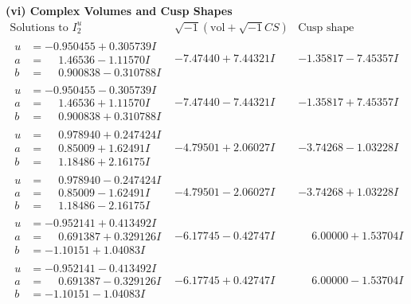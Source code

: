 \documentclass[1p]{elsarticle_modified}
\theoremstyle{definition}
\newcommand{\I}{\sqrt{-1}}
\begin{document}
\newpage\flushleft \textbf{(vi) Complex Volumes and Cusp Shapes}
$$\begin{array}{c|c|c}  
\text{Solutions to }I^u_{2}& \I (\text{vol} + \sqrt{-1}CS) & \text{Cusp shape}\\
 \hline 
\begin{aligned}
u &= -0.950455 + 0.305739 I \\
a &= \phantom{-}1.46536 - 1.11570 I \\
b &= \phantom{-}0.900838 - 0.310788 I\end{aligned}
 & -7.47440 + 7.44321 I & -1.35817 - 7.45357 I \\ \hline\begin{aligned}
u &= -0.950455 - 0.305739 I \\
a &= \phantom{-}1.46536 + 1.11570 I \\
b &= \phantom{-}0.900838 + 0.310788 I\end{aligned}
 & -7.47440 - 7.44321 I & -1.35817 + 7.45357 I \\ \hline\begin{aligned}
u &= \phantom{-}0.978940 + 0.247424 I \\
a &= \phantom{-}0.85009 + 1.62491 I \\
b &= \phantom{-}1.18486 + 2.16175 I\end{aligned}
 & -4.79501 + 2.06027 I & -3.74268 - 1.03228 I \\ \hline\begin{aligned}
u &= \phantom{-}0.978940 - 0.247424 I \\
a &= \phantom{-}0.85009 - 1.62491 I \\
b &= \phantom{-}1.18486 - 2.16175 I\end{aligned}
 & -4.79501 - 2.06027 I & -3.74268 + 1.03228 I \\ \hline\begin{aligned}
u &= -0.952141 + 0.413492 I \\
a &= \phantom{-}0.691387 + 0.329126 I \\
b &= -1.10151 + 1.04083 I\end{aligned}
 & -6.17745 - 0.42747 I & \phantom{-}6.00000 + 1.53704 I \\ \hline\begin{aligned}
u &= -0.952141 - 0.413492 I \\
a &= \phantom{-}0.691387 - 0.329126 I \\
b &= -1.10151 - 1.04083 I\end{aligned}
 & -6.17745 + 0.42747 I & \phantom{-}6.00000 - 1.53704 I \\ \hline\begin{aligned}

\end{aligned}
\end{array}$$
\end{document}
